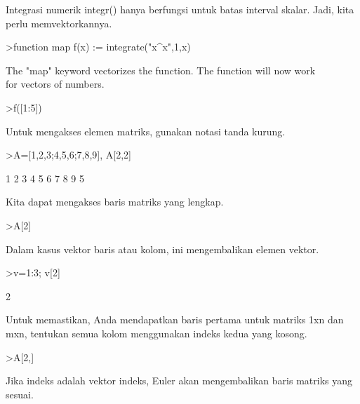 \documentclass[a4paper,10pt]{article}
\begin{document}
\begin{eulernotebook}
\begin{eulercomment}
\begin{eulercomment}
\begin{eulercomment}
\begin{eulercomment}
\begin{eulercomment}
\begin{eulercomment}
\begin{eulercomment}
Integrasi numerik integr() hanya berfungsi untuk batas interval
skalar. Jadi, kita perlu memvektorkannya.
\end{eulercomment}
\begin{eulerprompt}
>function map f(x) := integrate("x^x",1,x)
\end{eulerprompt}
\begin{eulercomment}
The "map" keyword vectorizes the function. The function will now work\\
for vectors of numbers.
\end{eulercomment}
\begin{eulerprompt}
>f([1:5])
\end{eulerprompt}
\begin{euleroutput}
  [0,  2.05045,  13.7251,  113.336,  1241.03]
\end{euleroutput}
\begin{eulercomment}
Untuk mengakses elemen matriks, gunakan notasi tanda kurung.
\end{eulercomment}
\begin{eulerprompt}
>A=[1,2,3;4,5,6;7,8,9], A[2,2]
\end{eulerprompt}
\begin{euleroutput}
              1             2             3 
              4             5             6 
              7             8             9 
  5
\end{euleroutput}
\begin{eulercomment}
Kita dapat mengakses baris matriks yang lengkap.
\end{eulercomment}
\begin{eulerprompt}
>A[2]
\end{eulerprompt}
\begin{euleroutput}
  [4,  5,  6]
\end{euleroutput}
\begin{eulercomment}
Dalam kasus vektor baris atau kolom, ini mengembalikan elemen vektor.
\end{eulercomment}
\begin{eulerprompt}
>v=1:3; v[2]
\end{eulerprompt}
\begin{euleroutput}
  2
\end{euleroutput}
\begin{eulercomment}
Untuk memastikan, Anda mendapatkan baris pertama untuk matriks 1xn dan
mxn, tentukan semua kolom menggunakan indeks kedua yang kosong.
\end{eulercomment}
\begin{eulerprompt}
>A[2,]
\end{eulerprompt}
\begin{euleroutput}
  [4,  5,  6]
\end{euleroutput}
\begin{eulercomment}
Jika indeks adalah vektor indeks, Euler akan mengembalikan baris
matriks yang sesuai.


\end{eulercomment}
\end{eulercomment}
\end{eulercomment}
\end{eulercomment}
\end{eulercomment}
\end{eulercomment}
\end{eulercomment}
\end{eulernotebook}
\end{document}
